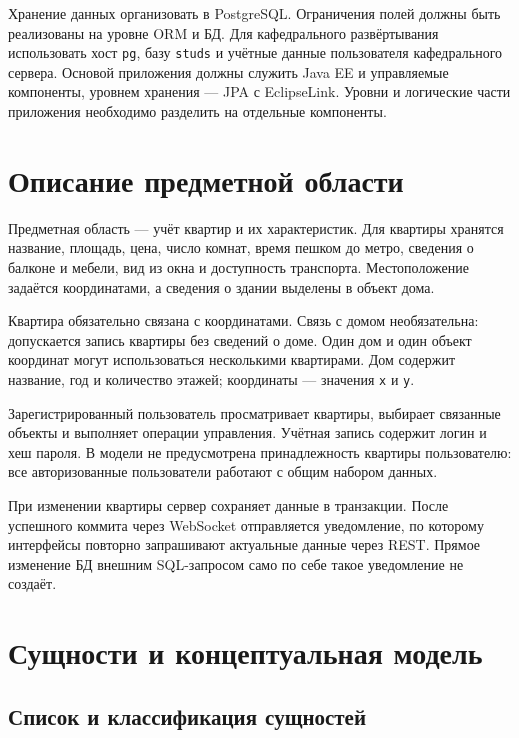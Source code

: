 \documentclass[12pt,a4paper]{article}
\begin{document}
Хранение данных организовать в PostgreSQL. Ограничения полей должны быть
реализованы на уровне ORM и БД. Для кафедрального развёртывания использовать
хост \texttt{pg}, базу \texttt{studs} и учётные данные пользователя кафедрального
сервера. Основой приложения должны служить Java EE и управляемые компоненты,
уровнем хранения --- JPA с EclipseLink. Уровни и логические части приложения
необходимо разделить на отдельные компоненты.

\section{Описание предметной области}

Предметная область --- учёт квартир и их характеристик. Для квартиры хранятся
название, площадь, цена, число комнат, время пешком до метро, сведения о балконе
и мебели, вид из окна и доступность транспорта. Местоположение задаётся
координатами, а сведения о здании выделены в объект дома.

Квартира обязательно связана с координатами. Связь с домом необязательна:
допускается запись квартиры без сведений о доме. Один дом и один объект
координат могут использоваться несколькими квартирами. Дом содержит название,
год и количество этажей; координаты --- значения \texttt{x} и \texttt{y}.

Зарегистрированный пользователь просматривает квартиры, выбирает связанные
объекты и выполняет операции управления. Учётная запись содержит логин и хеш
пароля. В модели не предусмотрена принадлежность квартиры пользователю:
все авторизованные пользователи работают с общим набором данных.

При изменении квартиры сервер сохраняет данные в транзакции. После успешного
коммита через WebSocket отправляется уведомление, по которому интерфейсы
повторно запрашивают актуальные данные через REST. Прямое изменение БД
внешним SQL-запросом само по себе такое уведомление не создаёт.

\section{Сущности и концептуальная модель}

\subsection{Список и классификация сущностей}
\end{document}
